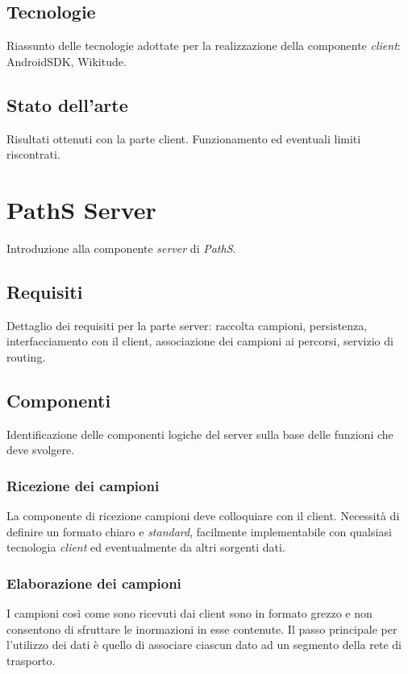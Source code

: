 \documentclass[a4paper, 12pt, twoside, openright]{book}
\begin{document}
\section{Tecnologie}
Riassunto delle tecnologie adottate per la realizzazione della componente \emph{client}: AndroidSDK, Wikitude.

\section{Stato dell'arte}
Risultati ottenuti con la parte client. Funzionamento ed eventuali limiti riscontrati.

\chapter{PathS Server} %
\thispagestyle{empty}

Introduzione alla componente \emph{server} di \emph{PathS}. 

\section{Requisiti}
Dettaglio dei requisiti per la parte server: raccolta campioni, persistenza, interfacciamento con il client, associazione dei campioni ai percorsi, servizio di routing.

\section{Componenti}
Identificazione delle componenti logiche del server sulla base delle funzioni che deve svolgere.
\subsection{Ricezione dei campioni}
La componente di ricezione campioni deve colloquiare con il client. Necessità di definire un formato chiaro e \emph{standard}, facilmente implementabile con qualsiasi tecnologia \emph{client} ed eventualmente da altri sorgenti dati.
\subsection{Elaborazione dei campioni}
I campioni così come sono ricevuti dai client sono in formato grezzo e non consentono di sfruttare le inormazioni in esse contenute. Il passo principale per l'utilizzo dei dati è quello di associare ciascun dato ad un segmento della rete di trasporto. 
\end{document}
